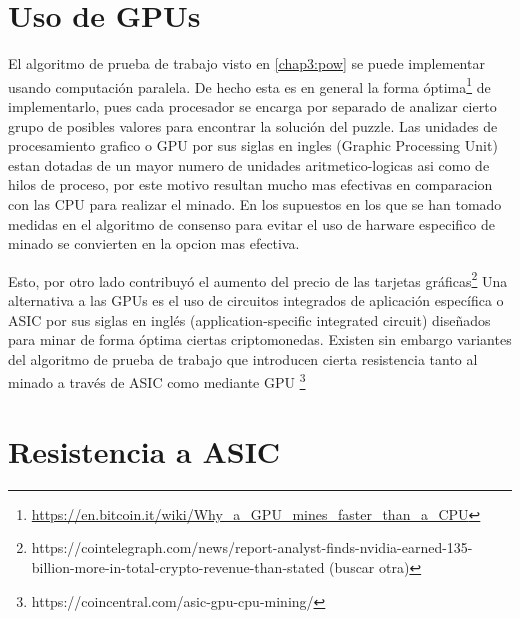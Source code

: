 \section{Uso de GPUs} %
El algoritmo de prueba de trabajo visto en \ref{chap3:pow} se puede implementar usando computación paralela. De hecho esta es en general la forma óptima\footnote{\url{https://en.bitcoin.it/wiki/Why_a_GPU_mines_faster_than_a_CPU}} de implementarlo, pues cada procesador se encarga por separado de analizar cierto grupo de posibles valores para encontrar la solución del puzzle. Las unidades de procesamiento grafico o GPU por sus siglas en ingles (Graphic Processing Unit) estan dotadas de un mayor numero de unidades aritmetico-logicas asi como de hilos de proceso, por este motivo resultan mucho mas efectivas en comparacion con las CPU para realizar el minado. En los supuestos en los que se han tomado medidas en el algoritmo de consenso para evitar el uso de harware especifico de minado se convierten en la opcion mas efectiva.


Esto, por otro lado contribuyó el aumento del precio de las tarjetas gráficas\footnote{https://cointelegraph.com/news/report-analyst-finds-nvidia-earned-135-billion-more-in-total-crypto-revenue-than-stated (buscar otra)}
Una alternativa a las GPUs es el uso de circuitos integrados de aplicación específica o ASIC por sus siglas en inglés (application-specific integrated circuit) diseñados para minar de forma óptima ciertas criptomonedas. Existen sin embargo variantes del algoritmo de prueba de trabajo que introducen cierta resistencia tanto al minado a través de ASIC como mediante GPU \footnote{https://coincentral.com/asic-gpu-cpu-mining/}

\section{Resistencia a ASIC}

